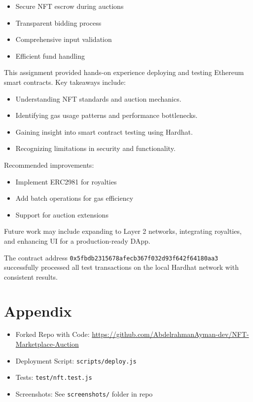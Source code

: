 \documentclass{article}
\begin{document}
\begin{itemize}
    \item Secure NFT escrow during auctions
    \item Transparent bidding process
    \item Comprehensive input validation
    \item Efficient fund handling
\end{itemize}

This assignment provided hands-on experience deploying and testing Ethereum smart contracts. Key takeaways include:

\begin{itemize}
  \item Understanding NFT standards and auction mechanics.
  \item Identifying gas usage patterns and performance bottlenecks.
  \item Gaining insight into smart contract testing using Hardhat.
  \item Recognizing limitations in security and functionality.
\end{itemize}

Recommended improvements:
\begin{itemize}
    \item Implement ERC2981 for royalties
    \item Add batch operations for gas efficiency
    \item Support for auction extensions
\end{itemize}

Future work may include expanding to Layer 2 networks, integrating royalties, and enhancing UI for a production-ready DApp.

The contract address \texttt{0x5fbdb2315678afecb367f032d93f642f64180aa3} successfully processed all test transactions on the local Hardhat network with consistent results.

\section*{Appendix}
\begin{itemize}
  \item Forked Repo with Code: \url{https://github.com/AbdelrahmanAyman-dev/NFT-Marketplace-Auction}
  \item Deployment Script: \texttt{scripts/deploy.js}
  \item Tests: \texttt{test/nft.test.js}
  \item Screenshots: See \texttt{screenshots/} folder in repo
\end{itemize}
\end{document}
